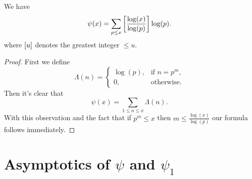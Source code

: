 \begin{lemma}
	We have
\begin{equation*}
	\psi(x) = \sum _{p \leq x} \left[\frac{\log(x)}{\log(p)}\right] \log(p).
\end{equation*}
	where $\left[u\right]$ denotes the greatest integer $\leq u$.
\end{lemma}
\begin{proof}
	First we define
\begin{equation*}
	\Lambda(n) =
    	\left\{
    		\begin{array}{ll}
        		\log(p), & \text{if } n = p^m,\\
        		0, & \text{otherwise}.
        	\end{array}
		\right.
\end{equation*}
	Then it's clear that
\begin{equation*}
	\psi(x) = \sum _{1 \leq n \leq x} \Lambda(n).
\end{equation*}
	With this observation and the fact that if $p^m \leq x$ then $m \leq \frac{\log(x)}{\log(p)}$ our formula follows immediately.
\end{proof}


\section{Asymptotics of $\psi$ and $\psi_1$}


